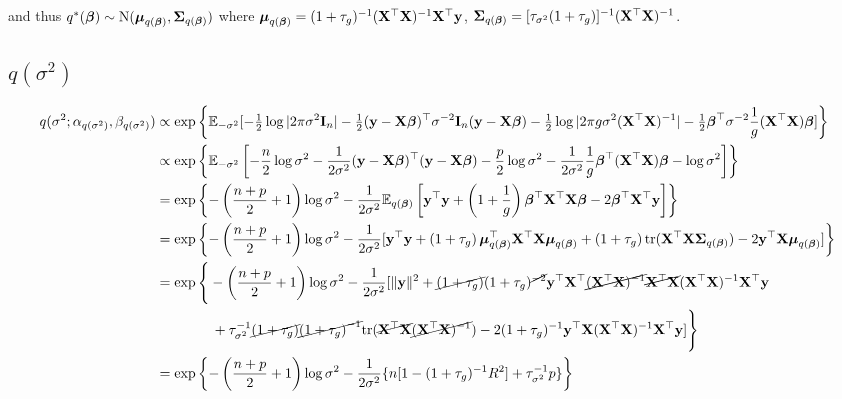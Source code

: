 \documentclass{amsart}[12pt]
\begin{document}
and thus
$q^*({\boldsymbol \beta}) \sim \text{N} ({\boldsymbol \mu}_{q({\boldsymbol \beta})}, {\boldsymbol \Sigma}_{q({\boldsymbol \beta})} )$
where ${\boldsymbol \mu}_{q({\boldsymbol \beta})} = (1 + \tau_g)^{-1} ({\bf X}^\top {\bf X})^{-1} {\bf X}^\top {\bf y}$,
${\boldsymbol \Sigma}_{q({\boldsymbol \beta})} = [\tau_{\sigma^2}(1 + \tau_{g})]^{-1}({\bf X}^\top {\bf X})^{-1}$.

\small
\subsection{$q(\sigma^2)$}
\begin{align*}
q(\sigma^2; \alpha_{q(\sigma^2)}, \beta_{q(\sigma^2)}) &\propto \exp \left \{ \mathbb{E}_{-\sigma^2} [-\tfrac{1}{2} \log |2 \pi \sigma^2 {\bf I}_n| - \tfrac{1}{2} ({\bf y} - {\bf X} {\boldsymbol \beta})^\top \sigma^{-2} {\bf I}_n ({\bf y} - {\bf X} {\boldsymbol \beta}) - \tfrac{1}{2} \log |2 \pi g \sigma^2 ({\bf X}^\top {\bf X})^{-1}| - \tfrac{1}{2} {\boldsymbol \beta}^\top \sigma^{-2} \frac{1}{g} ({\bf X}^\top {\bf X}) {\boldsymbol \beta}] \right \} \\
&\propto  \exp \left \{ \mathbb{E}_{-\sigma^2} \left[- \frac{n}{2} \log \sigma^2 - \frac{1}{2 \sigma^2}({\bf y} - {\bf X} {\boldsymbol \beta})^\top({\bf y} - {\bf X} {\boldsymbol \beta}) - \frac{p}{2} \log \sigma^2 - \frac{1}{2 \sigma^2} \frac{1}{g} {\boldsymbol \beta}^\top ({\bf X}^\top {\bf X}) {\boldsymbol \beta} - \log \sigma^2\right] \right \} \\
&=  \exp \left \{ {-\left(\frac{n + p}{2} + 1\right) \log \sigma^2 - \frac{1}{2 \sigma^2} \mathbb{E}_{q({\boldsymbol \beta})} \left[ {\bf y}^\top {\bf y} + \left(1 + \frac{1}{g} \right) {\boldsymbol \beta}^\top {\bf X}^\top {\bf X} {\boldsymbol\beta} - 2 {\boldsymbol \beta}^\top {\bf X}^\top {\bf y} \right]}  \right \}\\
&=  \exp \left \{ -\left(\frac{n + p}{2} + 1 \right)\log \sigma^2  - \frac{1}{2 \sigma^2} [{\bf y}^\top{\bf y} + \left( 1 + \tau_g \right) {\boldsymbol \mu}_{q({\boldsymbol \beta})}^\top {\bf X}^\top {\bf X} {\boldsymbol\mu}_{q({\boldsymbol \beta})} + \left( 1 + \tau_g \right) \text{tr}({\bf X}^\top {\bf X} {\boldsymbol\Sigma}_{q({\boldsymbol \beta})}) - 2 {\bf y}^\top {\bf X} {\boldsymbol\mu}_{q({\boldsymbol \beta})} ] \right \} \\
&=  \exp \Bigg \{ -\left(\frac{n + p}{2} + 1 \right)\log \sigma^2  - \frac{1}{2 \sigma^2} [\|{\bf y}\|^2 + \cancel{\left( 1 + \tau_g \right)} (1 + \tau_g)^{\cancel{-2}} {\bf y}^\top {\bf X}^\top \cancel{({\bf X}^\top {\bf X})^{-1}} \cancel{{\bf X}^\top {\bf X}} ({\bf X}^\top {\bf X})^{-1} {\bf X}^\top {\bf y}\\
&\quad \quad \quad \quad + \tau_{\sigma^2}^{-1} \cancel{\left( 1 + \tau_g \right)} \cancel{\left( 1 + \tau_g \right)^{-1}} \text{tr}(\cancel{{\bf X}^\top {\bf X}} \cancel{({\bf X}^\top {\bf X})^{-1}}) - 2 (1 + \tau_g)^{-1} {\bf y}^\top {\bf X} ({\bf X}^\top {\bf X})^{-1} {\bf X}^\top {\bf y} ] \Bigg \} \\
&= \exp \left \{ -\left(\frac{n + p}{2} + 1 \right)\log \sigma^2 - \frac{1}{2 \sigma^2} \{n[1 - (1 + \tau_g)^{-1}  R^2] + \tau_{\sigma^2}^{-1} p \} \right \}
\end{align*}
\end{document}
